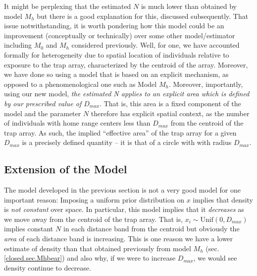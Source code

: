 It might be
perplexing that the estimated $N$ is much lower than obtained by model
$M_h$ but there is a good explanation for this, discussed
subsequently. That issue notwithstanding, it is worth pondering how
this model could be an improvement (conceptually or technically) over
some other model/estimator including $M_0$ and $M_h$ considered
previously. Well, for one, we have accounted formally for
heterogeneity due to spatial location of individuals relative to
exposure to the trap array, characterized by the centroid of the
array. Moreover, we have done so using a model that is based on an
explicit mechanism, as opposed to a phenomenological one such as Model
$M_h$. Moreover, importantly, using our new model, {\it the estimated N
  applies to an explicit area which is defined by our prescribed value
  of $D_{max}$}. That is, this area is a fixed component of the model and
the parameter $N$ therefore has explicit spatial context, as the number
of individuals with home range centers less than $D_{max}$ from the
centroid of the trap array. As such, the implied ``effective
area'' of the trap array for a given $D_{max}$ is a precisely defined
quantity -- it is that of a circle with with radius
$D_{max}$.


\subsection{Extension of the Model}

The model developed in the previous section
 is  not a very good model for one important reason:
Imposing a uniform prior distribution on $x$ implies that density is
{\it not constant} over space. In particular, this model implies that
it {\it decreases} as we move away from the centroid of the trap
array.  That is, $x_{i} \sim \mbox{Unif}(0,D_{max})$ implies constant
$N$ in each distance band from the centroid but obviously the {\it
  area} of each distance band is increasing.  This is one reason we
have a lower estimate of density than that obtained previously from
model $M_h$ (sec. \ref{closed.sec.Mhbear})
and also why, if we were to increase $D_{max}$, we would
see density continue to decrease.

